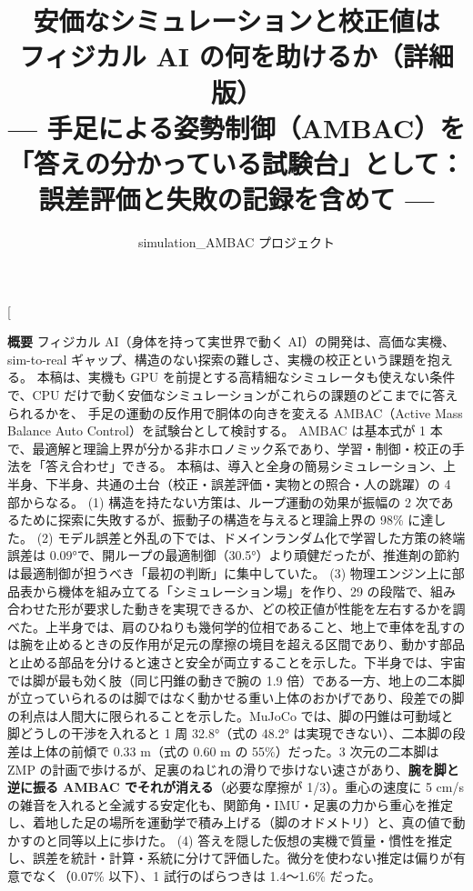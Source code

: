 \documentclass[paper=a4paper,fontsize=10pt,twocolumn,column_gap=2zw,line_length=24zw,number_of_lines=46,head_space=20mm]{jlreq}
\title{\textbf{安価なシミュレーションと校正値は\\フィジカル AI の何を助けるか（詳細版）}\\[0.3em]
\large --- 手足による姿勢制御（AMBAC）を「答えの分かっている試験台」として：\\誤差評価と失敗の記録を含めて ---}
\author{simulation\_AMBAC プロジェクト}
\date{\fpversion}
\begin{document}
\twocolumn[
\begin{@twocolumnfalse}
\maketitle
\vspace{-1.5em}
\begin{center}\begin{minipage}{0.9\textwidth}\small
\textbf{概要}\quad
フィジカル AI（身体を持って実世界で動く AI）の開発は、高価な実機、sim-to-real ギャップ、構造のない探索の難しさ、実機の校正という課題を抱える。
本稿は、実機も GPU を前提とする高精細なシミュレータも使えない条件で、CPU だけで動く安価なシミュレーションがこれらの課題のどこまでに答えられるかを、
手足の運動の反作用で胴体の向きを変える AMBAC（Active Mass Balance Auto Control）を試験台として検討する。
AMBAC は基本式が 1 本で、最適解と理論上界が分かる非ホロノミック系であり、学習・制御・校正の手法を「答え合わせ」できる。
本稿は、導入と全身の簡易シミュレーション、上半身、下半身、共通の土台（校正・誤差評価・実物との照合・人の跳躍）の 4 部からなる。
(1) 構造を持たない方策は、ループ運動の効果が振幅の 2 次であるために探索に失敗するが、振動子の構造を与えると理論上界の 98\% に達した。
(2) モデル誤差と外乱の下では、ドメインランダム化で学習した方策の終端誤差は 0.09°で、開ループの最適制御（30.5°）より頑健だったが、推進剤の節約は最適制御が担うべき「最初の判断」に集中していた。
(3) 物理エンジン上に部品表から機体を組み立てる「シミュレーション場」を作り、29 の段階で、組み合わせた形が要求した動きを実現できるか、どの校正値が性能を左右するかを調べた。上半身では、肩のひねりも幾何学的位相であること、地上で車体を乱すのは腕を止めるときの反作用が足元の摩擦の境目を超える区間であり、動かす部品と止める部品を分けると速さと安全が両立することを示した。下半身では、宇宙では脚が最も効く肢（同じ円錐の動きで腕の 1.9 倍）である一方、地上の二本脚が立っていられるのは脚ではなく動かせる重い上体のおかげであり、段差での脚の利点は人間大に限られることを示した。MuJoCo では、脚の円錐は可動域と脚どうしの干渉を入れると 1 周 32.8°（式の 48.2° は実現できない）、二本脚の段差は上体の前傾で 0.33 m（式の 0.60 m の 55\%）だった。3 次元の二本脚は ZMP の計画で歩けるが、足裏のねじれの滑りで歩けない速さがあり、\textbf{腕を脚と逆に振る AMBAC でそれが消える}（必要な摩擦が 1/3）。重心の速度に 5 cm/s の雑音を入れると全滅する安定化も、関節角・IMU・足裏の力から重心を推定し、着地した足の場所を運動学で積み上げる（脚のオドメトリ）と、真の値で動かすのと同等以上に歩けた。
(4) 答えを隠した仮想の実機で質量・慣性を推定し、誤差を統計・計算・系統に分けて評価した。微分を使わない推定は偏りが有意でなく（0.07\% 以下）、1 試行のばらつきは 1.4〜1.6\% だった。

\end{minipage}
\end{center}
\end{@twocolumnfalse}
\end{document}
